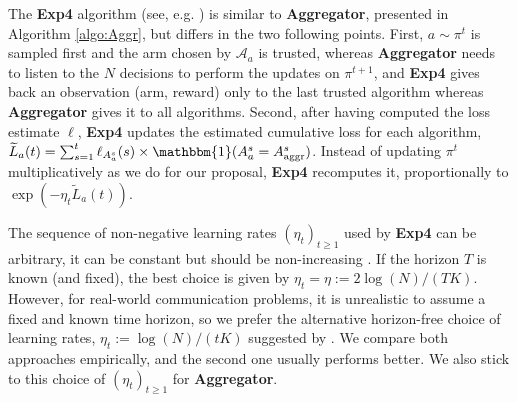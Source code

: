 \documentclass[conference]{IEEEtran}
\theoremstyle{plain}  %
\newcommand{\Aggr}[0]{\textbf{Aggregator}}
\newcommand{\ExpQ}[0]{\textbf{Exp4}}
\newcommand{\Alg}[0]{\mathcal{A}}
\begin{document}
The \ExpQ{} algorithm (see, e.g. \cite[Section 4.2]{Bubeck12})
is similar to \Aggr{}, presented in Algorithm \ref{algo:Aggr},
but differs in the two following points.
%
First, $a\sim\pi^t$ is sampled first and the arm chosen by $\Alg_a$ is trusted, whereas \Aggr{}
needs to listen to the $N$ decisions to perform the updates on $\pi^{t+1}$,
and \ExpQ{} gives back an observation (arm, reward) only to the last trusted algorithm
whereas \Aggr{} gives it to all algorithms.
%
Second, after having computed the loss estimate $\ell$, \ExpQ{} updates the estimated cumulative loss for each algorithm,
$\widetilde{L}_a(t) = \sum_{s=1}^{t} \ell_{A_a^s}(s) \times \mathbbm{1}(A^{s}_{a} = A^{s}_{\mathrm{aggr}})$.
%
Instead
of updating $\pi^{t}$ multiplicatively as we do for our proposal, \ExpQ{} recomputes it, proportionally to
$\exp(- \eta_t \widetilde{L}_a(t))$.
%
%

The sequence of non-negative learning rates $(\eta_t)_{t \geq 1}$ used by \ExpQ{} can be arbitrary, it can be constant but should be non-increasing \cite[Theorem 4.2]{Bubeck12}.
If the horizon $T$ is known (and fixed), the best choice is given by $\eta_t = \eta := 2 \log(N) / (T K)$.
However, for real-world communication problems, it is unrealistic to assume a fixed and known time horizon, so we prefer the alternative horizon-free choice of learning rates,
$\eta_t := \log(N) / (t K)$ suggested by \cite{Bubeck12}.
We compare both approaches empirically, and the second one usually performs better.
We also stick to this choice of $(\eta_t)_{t \geq 1}$ for \Aggr.
\end{document}
